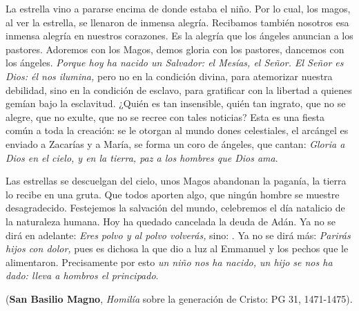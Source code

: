 \begin{patercite}
	La estrella vino a pararse encima de donde estaba el niño. Por lo cual, los magos, al ver la estrella, se llenaron de inmensa alegría. Recibamos también nosotros esa inmensa alegría en nuestros corazones. Es la alegría que los ángeles anuncian a los pastores. Adoremos con los Magos, demos gloria con los pastores, dancemos con los ángeles. \emph{Porque hoy ha nacido un Salvador: el Mesías, el Señor. El Señor es Dios: él nos ilumina,} pero no en la condición divina, para atemorizar nuestra debilidad, sino en la condición de esclavo, para gratificar con la libertad a quienes gemían bajo la esclavitud. ¿Quién es tan insensible, quién tan ingrato, que no se alegre, que no exulte, que no se recree con tales noticias? Esta es una fiesta común a toda la creación: se le otorgan al mundo dones celestiales, el arcángel es enviado a Zacarías y a María, se forma un coro de ángeles, que cantan: \emph{Gloria a Dios en el cielo, y en la tierra, paz a los hombres que Dios ama}.
	
	Las estrellas se descuelgan del cielo, unos Magos abandonan la paganía, la tierra lo recibe en una gruta. Que todos aporten algo, que ningún hombre se muestre desagradecido. Festejemos la salvación del mundo, celebremos el día natalicio de la naturaleza humana. Hoy ha quedado cancelada la deuda de Adán. Ya no se dirá en adelante: \emph{Eres polvo y al polvo volverás,} sino: . Ya no se dirá más: \emph{Parirás hijos con dolor,} pues es dichosa la que dio a luz al Emmanuel y los pechos que le alimentaron. Precisamente por esto \emph{un niño nos ha nacido, un hijo se nos ha dado: lleva a hombros el principado}.
	
	(\textbf{San Basilio Magno}, \emph{Homilía} sobre la generación de Cristo: PG 31, 1471-1475)\cite{BasilioMagno_PG031_1471}.
\end{patercite}